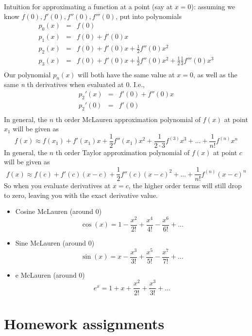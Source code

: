 \documentclass[10pt,letterpaper]{article}
\begin{document}
Intuition for approximating a function at a point (say at $x=0$): assuming we know $f(0),f'(0),f''(0),f'''(0)$, put into polynomials
\begin{eqnarray}
  p_0(x) &=& f(0) \\
  p_1(x) &=& f(0) + f'(0)x \\
  p_2(x) &=& f(0) + f'(0)x + \frac{1}{2} f''(0)x^2 \\
  p_3(x) &=& f(0) + f'(0)x + \frac{1}{2} f''(0)x^2 + \frac{1}{2} \frac{1}{3} f'''(0) x^3 \\
\end{eqnarray}
Our polynomial $p_n(x)$ will both have the same value at $x=0$, as well as the same \emph{n} th derivatives when evaluated at 0. I.e.,
\begin{eqnarray}
  p_2'(x) &=& f'(0) + f''(0) x \\
  p_2'(0) &=& f'(0) \\
\end{eqnarray}
In general, the $n$ th order McLauren approximation polynomial of $f(x)$ at point $x_1$ will be given as
$$
f(x) \approx f(x_1) + f'(x_1)x + \frac{1}{2} f''(x_1) x ^{2} + \frac{1}{2\cdot 3} f ^{(3)} x ^{3} + ... + \frac{1}{n!} f ^{(n)} x ^{n} 
$$ 
In general, the $n$ th order Taylor approximation polynomial of $f(x)$ at point $c$ will be given as
$$
f(x) \approx f(c) + f'(c)(x-c) + \frac{1}{2} f''(c) (x-c) ^{2} + ... + \frac{1}{n!} f ^{(n)} (x-c) ^{n} 
$$ 
So when you evaluate derivatives at $x=c$, the higher order terms will still drop to zero, leaving you with the exact derivative value.
\begin{itemize}

\item Cosine McLauren (around 0)\\
\label{sec-20_4_2_1}%
$$
\cos (x) = 1- \frac{x^2}{2!} + \frac{x^4}{4!} - \frac{x^6}{6!} + ...
$$ 

\item Sine McLauren (around 0)\\
\label{sec-20_4_2_2}%
$$
\sin(x) = x- \frac{x^3}{3!} + \frac{x^5}{5!} - \frac{x^7}{7!} + ...
$$ 

\item e McLauren (around 0)\\
\label{sec-20_4_2_3}%
$$
e ^{x} = 1+x + \frac{x^2}{2!} + \frac{x^3}{3!} + ...
$$ 
\end{itemize} %
\section{Homework assignments}
\label{sec-21}
\end{document}
